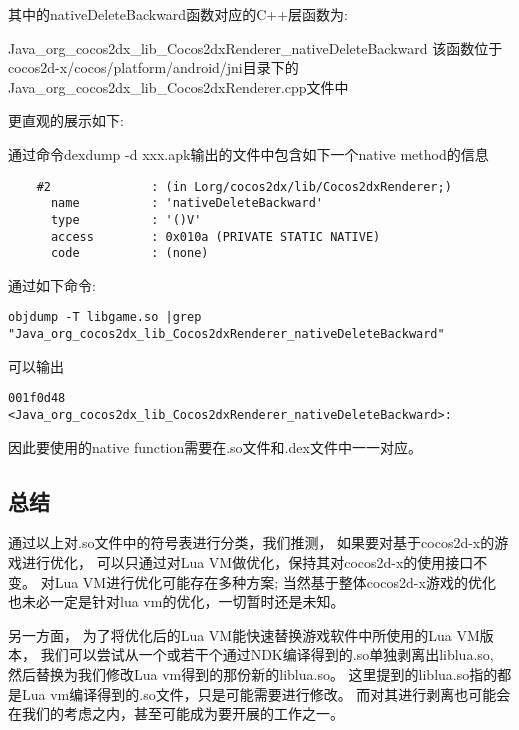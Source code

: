其中的nativeDeleteBackward函数对应的C++层函数为:

Java\_org\_cocos2dx\_lib\_Cocos2dxRenderer\_nativeDeleteBackward
该函数位于cocos2d-x/cocos/platform/android/jni目录下的\\
Java\_org\_cocos2dx\_lib\_Cocos2dxRenderer.cpp文件中

更直观的展示如下:

通过命令dexdump -d xxx.apk输出的文件中包含如下一个native method的信息
\begin{lstlisting}
    #2              : (in Lorg/cocos2dx/lib/Cocos2dxRenderer;)
      name          : 'nativeDeleteBackward'
      type          : '()V'
      access        : 0x010a (PRIVATE STATIC NATIVE)
      code          : (none)
\end{lstlisting}

通过如下命令:
\begin{lstlisting}
objdump -T libgame.so |grep "Java_org_cocos2dx_lib_Cocos2dxRenderer_nativeDeleteBackward"
\end{lstlisting}

可以输出
\begin{lstlisting}
001f0d48 <Java_org_cocos2dx_lib_Cocos2dxRenderer_nativeDeleteBackward>:
\end{lstlisting}

因此要使用的native function需要在.so文件和.dex文件中一一对应。

\subsection{总结}
\label{sec:so:conclusion}
通过以上对.so文件中的符号表进行分类，我们推测，
如果要对基于cocos2d-x的游戏进行优化，
可以只通过对Lua VM做优化，保持其对cocos2d-x的使用接口不变。
对Lua VM进行优化可能存在多种方案;
当然基于整体cocos2d-x游戏的优化
也未必一定是针对lua vm的优化，一切暂时还是未知。

另一方面，
为了将优化后的Lua VM能快速替换游戏软件中所使用的Lua VM版本，
我们可以尝试从一个或若干个通过NDK编译得到的.so单独剥离出liblua.so,
然后替换为我们修改Lua vm得到的那份新的liblua.so。
这里提到的liblua.so指的都是Lua vm编译得到的.so文件，只是可能需要进行修改。
而对其进行剥离也可能会在我们的考虑之内，甚至可能成为要开展的工作之一。


